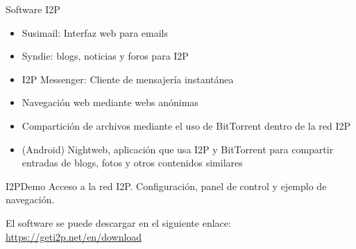 \documentclass[spanish]{beamer}
\begin{document}
 
 \begin{frame}{Software I2P}
 	
 
 \begin{itemize}
 	\item Susimail: Interfaz web  para emails
 	\item Syndie: blogs, noticias y foros para I2P
 	\item I2P Messenger: Cliente de mensajería instantánea
 	\item Navegación web mediante webs anónimas
 	\item Compartición de archivos mediante el uso de BitTorrent dentro de la red I2P
 	\item (Android) Nightweb, aplicación que usa I2P y BitTorrent para compartir entradas
 	de blogs, fotos y otros contenidos similares
 \end{itemize}
 	
 \end{frame}

\begin{frame}{I2P}{Demo}
Acceso a la red I2P. Configuración, panel de control y ejemplo de navegación.\\

\vspace{2em}

El software se puede descargar en el siguiente enlace: \href{https://geti2p.net/en/download}{\url{https://geti2p.net/en/download}}
	
\end{frame}
\end{document}

